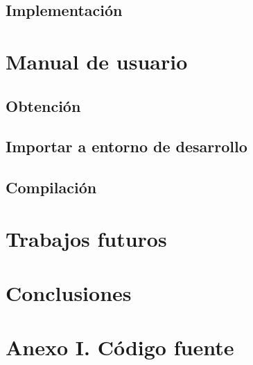 \documentclass{estilos-y-libreria}
\begin{document}
	\section{Implementaci\'on}

\chapter{Manual de usuario}
	\section{Obtenci\'on}
		
	\section{Importar a entorno de desarrollo}
		
	\section{Compilaci\'on}
		

\chapter{Trabajos futuros}

\chapter{Conclusiones}

\chapter{Anexo I. C\'odigo fuente}

\end{document}

